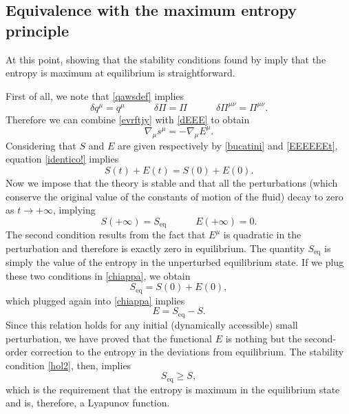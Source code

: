 \documentclass[a4paper, amsfonts, amssymb, amsmath, reprint, showkeys, nofootinbib, twoside]{revtex4-1}
\newcommand{\spc}{\quad \quad \quad}
\begin{document}
\subsection{Equivalence with the maximum entropy principle}

At this point, showing that the stability conditions found by \citet{Hishcock1983} imply that the entropy is maximum at equilibrium is straightforward.

First of all, we note that \eqref{qawsdef} implies
\begin{equation}
\delta q^\mu = q^\mu \spc \delta \Pi = \Pi  \spc \delta  \Pi^{\mu \nu} = \Pi^{\mu \nu}.
\end{equation}
Therefore we can combine \eqref{evrftjy} with \eqref{dEEE} to obtain
\begin{equation}\label{identico!}
\nabla_\mu s^\mu = -\nabla_\mu E^\mu.  
\end{equation}
Considering that $S$ and $E$ are given respectively by \eqref{bucatini} 
and \eqref{EEEEEEt}, equation \eqref{identico!} implies
\begin{equation}\label{chiappa}
S(t)+E(t) = S(0)+E(0).
\end{equation}
Now we impose that the theory is stable and that all the perturbations (which conserve the original value of the constants of motion of the fluid) decay to zero as $t \longrightarrow +\infty$, implying
\begin{equation}
S(+\infty)=S_{\text{eq}}  \spc E(+\infty)=0.
\end{equation}
The second condition results from the fact that $E^\mu$ is quadratic in the perturbation and therefore is exactly zero in equilibrium. The quantity $S_{\text{eq}}$ is simply the value of the entropy in the unperturbed equilibrium state. If we plug these two conditions in \eqref{chiappa}, we obtain
\begin{equation}
S_{\text{eq}} =S(0)+E(0),
\end{equation}
which plugged again into \eqref{chiappa} implies
\begin{equation}
E = S_{\text{eq}} -S.
\end{equation}
Since this relation holds for any initial (dynamically accessible) small perturbation, we have proved that the functional $E$ is nothing but the second-order correction to the entropy in the deviations from equilibrium. The stability condition \eqref{hol2}, then, implies
\begin{equation}
S_{\text{eq}} \geq S,
\end{equation}
which is the requirement that the entropy is maximum in the equilibrium state and is, therefore, a Lyapunov function.
\end{document}
